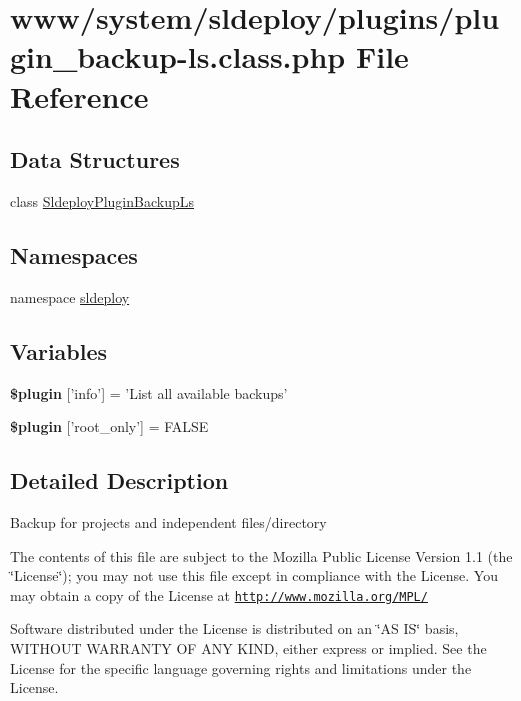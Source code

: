 \hypertarget{plugin__backup-ls_8class_8php}{
\section{www/system/sldeploy/plugins/plugin\_\-backup-\/ls.class.php File Reference}
\label{plugin__backup-ls_8class_8php}
}
\subsection*{Data Structures}
\begin{DoxyCompactItemize}
\item 
class \hyperlink{class_sldeploy_plugin_backup_ls}{SldeployPluginBackupLs}
\end{DoxyCompactItemize}
\subsection*{Namespaces}
\begin{DoxyCompactItemize}
\item 
namespace \hyperlink{namespacesldeploy}{sldeploy}
\end{DoxyCompactItemize}
\subsection*{Variables}
\begin{DoxyCompactItemize}
\item 
\hypertarget{plugin__backup-ls_8class_8php_a95edf69ebbeaeedb03bab3bb010f2af9}{
{\bfseries \$plugin} \mbox{[}'info'\mbox{]} = 'List all available backups'}
\label{plugin__backup-ls_8class_8php_a95edf69ebbeaeedb03bab3bb010f2af9}

\item 
\hypertarget{plugin__backup-ls_8class_8php_a1d302084fa15e3efe6c843cbb5096985}{
{\bfseries \$plugin} \mbox{[}'root\_\-only'\mbox{]} = FALSE}
\label{plugin__backup-ls_8class_8php_a1d302084fa15e3efe6c843cbb5096985}

\end{DoxyCompactItemize}


\subsection{Detailed Description}
Backup for projects and independent files/directory

The contents of this file are subject to the Mozilla Public License Version 1.1 (the \char`\"{}License\char`\"{}); you may not use this file except in compliance with the License. You may obtain a copy of the License at \href{http://www.mozilla.org/MPL/}{\tt http://www.mozilla.org/MPL/}

Software distributed under the License is distributed on an \char`\"{}AS IS\char`\"{} basis, WITHOUT WARRANTY OF ANY KIND, either express or implied. See the License for the specific language governing rights and limitations under the License. 